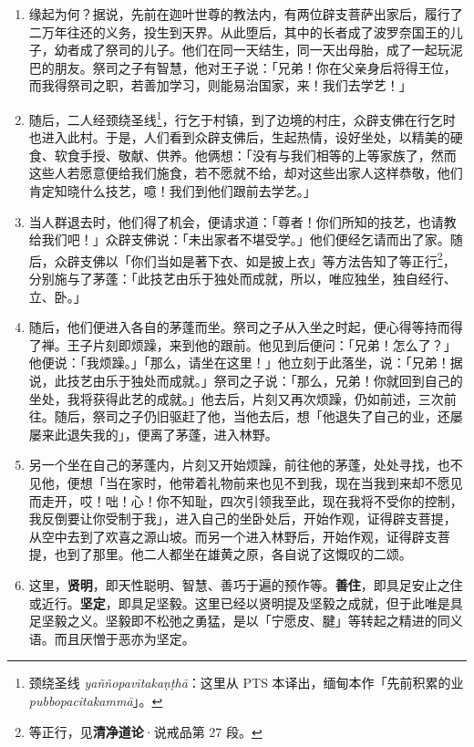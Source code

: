 \begin{enumerate}\item 缘起为何？据说，先前在迦叶世尊的教法内，有两位辟支菩萨出家后，履行了二万年往还的义务，投生到天界。从此堕后，其中的长者成了波罗奈国王的儿子，幼者成了祭司的儿子。他们在同一天结生，同一天出母胎，成了一起玩泥巴的朋友。祭司之子有智慧，他对王子说：「兄弟！你在父亲身后将得王位，而我得祭司之职，若善加学习，则能易治国家，来！我们去学艺！」
\item 随后，二人经颈绕圣线\footnote{颈绕圣线 \textit{yaññopavītakaṇṭhā}：这里从 PTS 本译出，缅甸本作「先前积累的业 \textit{pubbopacitakammā}」。}，行乞于村镇，到了边境的村庄，众辟支佛在行乞时也进入此村。于是，人们看到众辟支佛后，生起热情，设好坐处，以精美的硬食、软食手授、敬献、供养。他俩想：「没有与我们相等的上等家族了，然而这些人若愿意便给我们施食，若不愿就不给，却对这些出家人这样恭敬，他们肯定知晓什么技艺，噫！我们到他们跟前去学艺。」
\item 当人群退去时，他们得了机会，便请求道：「尊者！你们所知的技艺，也请教给我们吧！」众辟支佛说：「未出家者不堪受学。」他们便经乞请而出了家。随后，众辟支佛以「你们当如是著下衣、如是披上衣」等方法告知了等正行\footnote{等正行，见\textbf{清净道论}·说戒品第 27 段。}，分别施与了茅蓬：「此技艺由乐于独处而成就，所以，唯应独坐，独自经行、立、卧。」
\item 随后，他们便进入各自的茅蓬而坐。祭司之子从入坐之时起，便心得等持而得了禅。王子片刻即烦躁，来到他的跟前。他见到后便问：「兄弟！怎么了？」他便说：「我烦躁。」「那么，请坐在这里！」他立刻于此落坐，说：「兄弟！据说，此技艺由乐于独处而成就。」祭司之子说：「那么，兄弟！你就回到自己的坐处，我将获得此艺的成就。」他去后，片刻又再次烦躁，仍如前述，三次前往。随后，祭司之子仍旧驱赶了他，当他去后，想「他退失了自己的业，还屡屡来此退失我的」，便离了茅蓬，进入林野。
\item 另一个坐在自己的茅蓬内，片刻又开始烦躁，前往他的茅蓬，处处寻找，也不见他，便想「当在家时，他带着礼物前来也见不到我，现在当我到来却不愿见而走开，哎！咄！心！你不知耻，四次引领我至此，现在我将不受你的控制，我反倒要让你受制于我」，进入自己的坐卧处后，开始作观，证得辟支菩提，从空中去到了欢喜之源山坡。而另一个进入林野后，开始作观，证得辟支菩提，也到了那里。他二人都坐在雄黄之原，各自说了这慨叹的二颂。
\item 这里，\textbf{贤明}，即天性聪明、智慧、善巧于遍的预作等。\textbf{善住}，即具足安止之住或近行。\textbf{坚定}，即具足坚毅。这里已经以贤明提及坚毅之成就，但于此唯是具足坚毅之义。坚毅即不松弛之勇猛，是以「宁愿皮、腱」等转起之精进的同义语。而且厌憎于恶亦为坚定。\end{enumerate}

